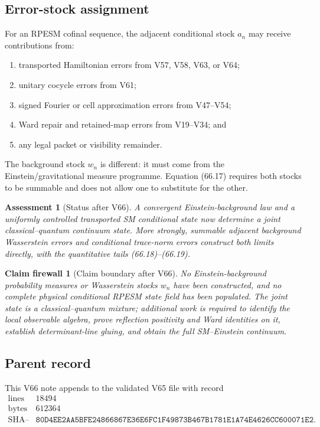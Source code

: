 \documentclass[11pt]{article}
\newtheorem{firewall}[theorem]{Claim firewall}
\newtheorem{assessment}[theorem]{Assessment}
\theoremstyle{remark}
\begin{document}
\subsection{Error-stock assignment}

For an RPESM cofinal sequence, the adjacent conditional stock
\(a_n\) may receive contributions from:
\begin{enumerate}
\item transported Hamiltonian errors from V57, V58, V63, or V64;
\item unitary cocycle errors from V61;
\item signed Fourier or cell approximation errors from V47--V54;
\item Ward repair and retained-map errors from V19--V34; and
\item any legal packet or visibility remainder.
\end{enumerate}
The background stock \(w_n\) is different: it must come from the
Einstein/gravitational measure programme.  Equation (66.17) requires
both stocks to be summable and does not allow one to substitute for
the other.

\begin{assessment}[Status after V66]
\label{ass:v12v66-status}
A convergent Einstein-background law and a uniformly controlled
transported SM conditional state now determine a joint
classical--quantum continuum state.  More strongly, summable
adjacent background Wasserstein errors and conditional trace-norm
errors construct both limits directly, with the quantitative tails
(66.18)--(66.19).
\end{assessment}

\begin{firewall}[Claim boundary after V66]
\label{fire:v12v66-claim}
No Einstein-background probability measures or Wasserstein stocks
\(w_n\) have been constructed, and no complete physical conditional
RPESM state field has been populated.  The joint state is a
classical--quantum mixture; additional work is required to identify
the local observable algebra, prove reflection positivity and Ward
identities on it, establish determinant-line gluing, and obtain the
full SM--Einstein continuum.
\end{firewall}

\subsection{Parent record}

This V66 note appends to the validated V65 file with record
\[
\begin{array}{c|c}
\text{lines}&18494\\
\text{bytes}&612364\\
\text{SHA--256}&
\texttt{80D4EE2AA5BFE24866867E36E6FC1F49873B467B1781E1A74E4626CC600071E2}.
\end{array}
\]
\end{document}
